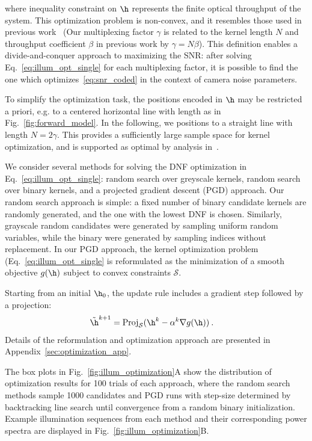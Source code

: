 \noindent where inequality constraint on $\h$ represents the finite optical throughput of the system.
This optimization problem is non-convex, and it resembles those used in previous work~\cite{raskar2006coded,agrawal2009optimal,Ma:15} (Our multiplexing factor $\gamma$ is related to the kernel length $N$ and throughput coefficient $\beta$ in previous work by $\gamma = N\beta$). This definition enables a divide-and-conquer approach to maximizing the SNR: after solving Eq.~\ref{eq:illum_opt_single} for each multiplexing factor, it is possible to find the one which optimizes~\eqref{eq:snr_coded} in the context of camera noise parameters.

To simplify the optimization task, the positions encoded in $\h$ may be restricted a priori, e.g. to a centered horizontal line with length as in Fig.~\ref{fig:forward_model}. In the following, we positions to a straight line with length $N=2\gamma$. This provides a sufficiently large sample space for kernel optimization, and is supported as optimal by analysis in~\cite{agrawal2009optimal}.

We consider several methods for solving the DNF optimization in Eq.~\ref{eq:illum_opt_single}: random search over greyscale kernels, random search over binary kernels, and a projected gradient descent (PGD) approach. Our random search approach is simple: a fixed number of binary candidate kernels are randomly generated, and the one with the lowest DNF is chosen. Similarly, grayscale random candidates were generated by sampling uniform random variables, while the binary were generated by sampling indices without replacement. In our PGD approach, the kernel optimization problem (Eq.~\ref{eq:illum_opt_single} is reformulated as the minimization of a smooth objective $g(\h)$ subject to convex constraints $\mathcal{S}$.

Starting from an initial $\h_0$, the update rule includes a gradient step followed by a projection:
\begin{align*}
    \tilde \h^{k+1} &= \mathrm{Proj}_{\mathcal{S}}(\h^k - \alpha^k \nabla g(\h))\:.
\end{align*}
Details of the reformulation and optimization approach are presented in Appendix~\ref{sec:optimization_app}.

The box plots in Fig.~\ref{fig:illum_optimization}A show the distribution of optimization results for 100 trials of each approach, where the random search methods sample 1000 candidates and PGD runs with step-size determined by backtracking line search until convergence from a random binary initialization. Example illumination sequences from each method and their corresponding power spectra are displayed in Fig.~\ref{fig:illum_optimization}B.

